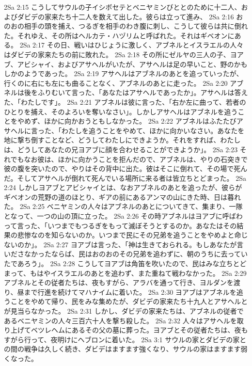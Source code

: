 2Sa 2:15  こうしてサウルの子イシボセテとベニヤミンびととのために十二人、およびダビデの家来たち十二人を数えて出した。彼らは立って進み、
2Sa 2:16  おのおの相手の頭を捕え、つるぎを相手のわき腹に刺し、こうして彼らは共に倒れた。それゆえ、その所はヘルカテ・ハヅリムと呼ばれた。それはギベオンにある。
2Sa 2:17  その日、戦いはひじょうに激しく、アブネルとイスラエルの人々はダビデの家来たちの前に敗れた。
2Sa 2:18  その所にゼルヤの三人の子、ヨアブ、アビシャイ、およびアサヘルがいたが、アサヘルは足の早いこと、野のかもしかのようであった。
2Sa 2:19  アサヘルはアブネルのあとを追っていったが、行くのに右にも左にも曲ることなく、アブネルのあとに走った。
2Sa 2:20  アブネルは後をふりむいて言った、「あなたはアサヘルであったか」。アサヘルは答えた、「わたしです」。
2Sa 2:21  アブネルは彼に言った、「右か左に曲って、若者のひとりを捕え、そのよろいを奪いなさい」。しかしアサヘルはアブネルを追うことをやめず、ほかに向かおうともしなかった。
2Sa 2:22  アブネルはふたたびアサヘルに言った、「わたしを追うことをやめて、ほかに向かいなさい。あなたを地に撃ち倒すことなど、どうしてわたしにできようか。それをすれば、わたしは、どうしてあなたの兄ヨアブに顔を合わせることができようか」。
2Sa 2:23  それでもなお彼は、ほかに向かうことを拒んだので、アブネルは、やりの石突きで彼の腹を突いたので、やりはその背中に出た。彼はそこに倒れて、その場で死んだ。そしてアサヘルが倒れて死んでいる場所に来る者は皆立ちとどまった。
2Sa 2:24  しかしヨアブとアビシャイとは、なおアブネルのあとを追ったが、彼らがギベオンの荒野の道のほとり、ギアの前にあるアンマの山にきた時、日は暮れた。
2Sa 2:25  ベニヤミンの人々はアブネルのあとについてきて、集まり、一隊となって、一つの山の頂に立った。
2Sa 2:26  その時アブネルはヨアブに呼ばわって言った、「いつまでもつるぎをもって滅ぼそうとするのか。あなたはその結果の悲惨なのを知らないのか。いつまで民にその兄弟を追うことをやめよと命じないのか」。
2Sa 2:27  ヨアブは言った、「神は生きておられる。もしあなたが言いださなかったならば、民はおのおのその兄弟を追わずに、朝のうちに去っていたであろう」。
2Sa 2:28  こうしてヨアブは角笛を吹いたので、民はみな立ちとどまって、もはやイスラエルのあとを追わず、また重ねて戦わなかった。
2Sa 2:29  アブネルとその従者たちは、夜もすがら、アラバを通って行き、ヨルダンを渡り、昼まで行進を続けてマハナイムに着いた。
2Sa 2:30  ヨアブはアブネルを追うことをやめて帰り、民をみな集めたが、ダビデの家来たち十九人とアサヘルとが見当らなかった。
2Sa 2:31  しかし、ダビデの家来たちは、アブネルの従者であるベニヤミンの人々三百六十人を撃ち殺した。
2Sa 2:32  人々はアサヘルを取り上げてベツレヘムにあるその父の墓に葬った。ヨアブとその従者たちは、夜もすがら行って、夜明けにヘブロンに着いた。
2Sa 3:1  サウルの家とダビデの家との間の戦争は久しく続き、ダビデはますます強くなり、サウルの家はますます弱くなった。
